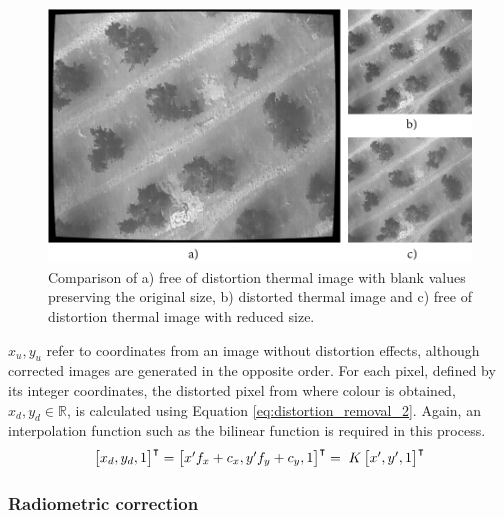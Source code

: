 \begin{figure}[hbt]
	\centering
	\includegraphics{figs/materials/thermal_distortion_2.png}
	\caption{Comparison of a) free of distortion thermal image with blank values preserving the original size, b) distorted thermal image and c) free of distortion thermal image with reduced size.}
	\label{fig:thermal_undistortion}
\end{figure}

$x_u, y_u$ refer to coordinates from an image without distortion effects, although corrected images are generated in the opposite order. For each pixel, defined by its integer coordinates, the distorted pixel from where colour is obtained, $x_{d}, y_{d} \in{\mathbb{R}}$, is calculated using Equation \ref{eq:distortion_removal_2}. Again, an interpolation function such as the bilinear function is required in this process.
\begin{gather}
    \label{eq:distortion_removal_2}
    \begin{aligned}
        \begin{bmatrix} 
            x_d, y_d, 1
        \end{bmatrix}^\intercal 
        =
        \begin{bmatrix}
            {x'}f_x + c_x, {y'}f_y + c_y, 1
        \end{bmatrix}^\intercal
        =
        \hspace{1mm} K \begin{bmatrix}
            {x'}, {y'}, 1
        \end{bmatrix}^\intercal
    \end{aligned}
\end{gather}

\subsubsection{Radiometric correction}

